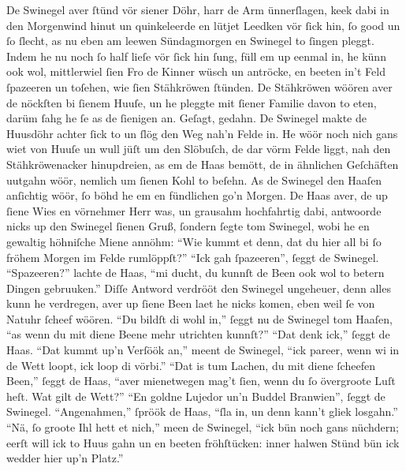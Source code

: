 De Swinegel aver ſtünd vör siener Döhr, harr de Arm ünnerſlagen,
keek dabi in den Morgenwind hinut un quinkeleerde en lütjet Leedken
vör ſick hin, ſo good un ſo ſlecht, as nu eben am leewen
Sündagmorgen en Swinegel to ſingen pleggt. Indem he nu noch ſo half
lieſe vör ſick hin ſung, füll em up eenmal in, he künn ook wol,
mittlerwiel ſien Fro de Kinner wüsch un antröcke, en beeten in't
Feld ſpazeeren un toſehen, wie ſien Stähkröwen ſtünden. De
Stähkröwen wöören aver de nöckſten bi ſienem Huuſe, un he pleggte
mit ſiener Familie davon to eten, darüm ſahg he ſe as de ſienigen
an. Geſagt, gedahn. De Swinegel makte de Huusdöhr achter ſick to un
ſlög den Weg nah'n Felde in. He wöör noch nich gans wiet von Huuſe
un wull jüſt um den Slöbuſch, de dar vörm
Felde liggt, nah den Stähkröwenacker hinupdreien, as em de Haas
bemött, de in ähnlichen Geſchäften uutgahn wöör, nemlich um ſienen
Kohl to beſehn. As de Swinegel den Haaſen anſichtig wöör, ſo böhd he
em en fündlichen go'n Morgen. De Haas aver, de up ſiene Wies en
vörnehmer Herr was, un grausahm hochfahrtig dabi, antwoorde nicks up
den Swinegel ſienen Gruß, ſondern ſegte tom Swinegel, wobi he en
gewaltig höhniſche Miene annöhm: \enquote{Wie kummt et denn, dat du
hier all bi ſo fröhem Morgen im Felde rumlöppſt?}
\enquote{Ick gah ſpazeeren}, ſeggt de Swinegel.
\enquote{Spazeeren?} lachte de Haas, \enquote{mi ducht, du kunnſt de
Been ook wol to betern Dingen gebruuken.}
Diſſe Antword verdrööt den Swinegel ungeheuer, denn alles kunn he
verdregen, aver up ſiene Been laet he nicks komen, eben weil ſe von
Natuhr ſcheef wöören.
\enquote{Du bildſt di wohl in,} ſeggt nu de Swinegel tom Haaſen,
\enquote{as wenn du mit diene Beene mehr utrichten kunnſt?}
\enquote{Dat denk ick,} ſeggt de Haas.
\enquote{Dat kummt up'n Verſöök an,} meent de Swinegel,
\enquote{ick pareer, wenn wi in de Wett loopt, ick loop di vörbi.}
\enquote{Dat is tum Lachen, du mit diene ſcheefen Been,} ſeggt de
Haas, \enquote{aver mienetwegen mag't ſien, wenn du ſo övergroote
Luſt heſt. Wat gilt de Wett?}
\enquote{En goldne Lujedor un'n Buddel Branwien}, ſeggt de Swinegel.
\enquote{Angenahmen,} ſpröök de Haas, \enquote{ſla in, un denn
kann't gliek losgahn.}
\enquote{Nä, ſo groote Ihl hett et nich,} meen de Swinegel,
\enquote{ick bün noch gans nüchdern; eerſt will ick to Huus gahn un
en beeten fröhſtücken: inner halwen Stünd bün ick wedder hier up'n
Platz.}

